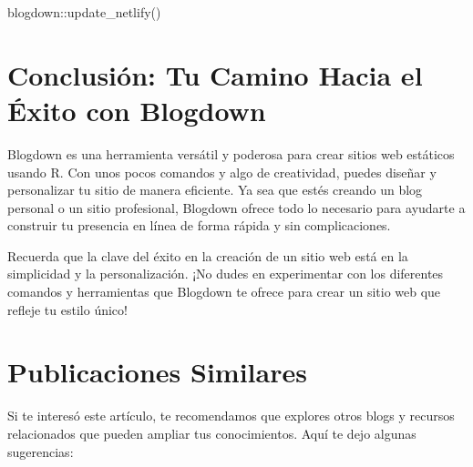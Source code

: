\documentclass[
  doc,
  floatsintext,
  longtable,
  a4paper,
  nolmodern,
  notxfonts,
  notimes,
  colorlinks=true,linkcolor=blue,citecolor=blue,urlcolor=blue]{apa7}
\newenvironment{Shaded}{\begin{snugshade}}{\end{snugshade}}
\newcommand{\FunctionTok}[1]{\textcolor[rgb]{0.28,0.35,0.67}{#1}}
\newcommand{\NormalTok}[1]{\textcolor[rgb]{0.00,0.23,0.31}{#1}}
\newcommand{\SpecialCharTok}[1]{\textcolor[rgb]{0.37,0.37,0.37}{#1}}
\begin{document}
\begin{Shaded}
\begin{Highlighting}[]
\NormalTok{blogdown}\SpecialCharTok{::}\FunctionTok{update\_netlify}\NormalTok{()}
\end{Highlighting}
\end{Shaded}

\section{Conclusión: Tu Camino Hacia el Éxito con
Blogdown}\label{conclusiuxf3n-tu-camino-hacia-el-uxe9xito-con-blogdown}

Blogdown es una herramienta versátil y poderosa para crear sitios web
estáticos usando R. Con unos pocos comandos y algo de creatividad,
puedes diseñar y personalizar tu sitio de manera eficiente. Ya sea que
estés creando un blog personal o un sitio profesional, Blogdown ofrece
todo lo necesario para ayudarte a construir tu presencia en línea de
forma rápida y sin complicaciones.

Recuerda que la clave del éxito en la creación de un sitio web está en
la simplicidad y la personalización. ¡No dudes en experimentar con los
diferentes comandos y herramientas que Blogdown te ofrece para crear un
sitio web que refleje tu estilo único!

\section{Publicaciones Similares}\label{publicaciones-similares}

Si te interesó este artículo, te recomendamos que explores otros blogs y
recursos relacionados que pueden ampliar tus conocimientos. Aquí te dejo
algunas sugerencias:
\end{document}
